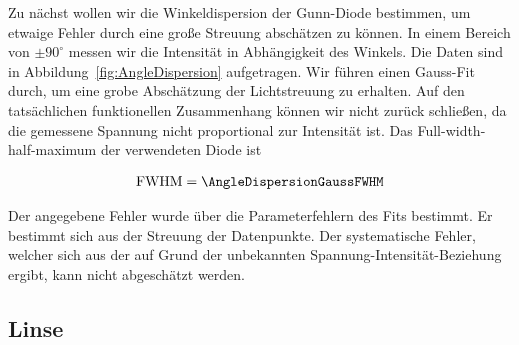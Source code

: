 \documentclass[a4paper,10pt,twocolumn]{article}
\begin{document}
    Zu nächst wollen wir die Winkeldispersion der Gunn-Diode bestimmen, um etwaige Fehler durch eine
    große Streuung abschätzen zu können.
    In einem Bereich von $\pm 90 ^{\circ}$ messen wir die Intensität in Abhängigkeit des Winkels.
    Die Daten sind in Abbildung~\ref{fig:AngleDispersion} aufgetragen.
    Wir führen einen Gauss-Fit durch, um eine grobe Abschätzung der Lichtstreuung zu erhalten.
    Auf den tatsächlichen funktionellen Zusammenhang können wir nicht zurück schließen, da die gemessene Spannung
    nicht proportional zur Intensität ist.
    Das Full-width-half-maximum der verwendeten Diode ist
    
    \begin{align*}
        \mathrm{FWHM} = \AngleDispersionGaussFWHM
    \end{align*}
    
    Der angegebene Fehler wurde über die Parameterfehlern des Fits bestimmt.
    Er bestimmt sich aus der Streuung der Datenpunkte.
    Der systematische Fehler, welcher sich aus der auf Grund der unbekannten Spannung-Intensität-Beziehung ergibt, kann
    nicht abgeschätzt werden.
    
    \subsection{Linse}

    
\end{document}
